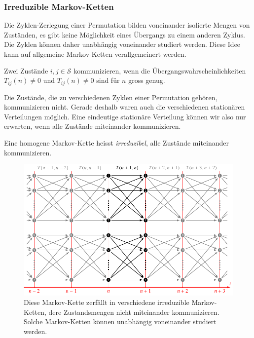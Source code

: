 \subsubsection{Irreduzible Markov-Ketten}
Die Zyklen-Zerlegung einer Permutation bilden voneinander isolierte
Mengen von Zuständen, es gibt keine Möglichkeit eines Übergangs zu
einem anderen Zyklus.
Die Zyklen können daher unabhängig voneinander studiert werden.
Diese Idee kann auf allgemeine Markov-Ketten verallgemeinert werden.

\begin{definition}
Zwei Zustände $i,j\in\mathcal{S}$ kommunizieren, wenn die
Übergangswahrscheinlichkeiten $T_{ij}(n) \ne 0$ und $T_{ij}(n)\ne 0$ sind
für $n$ gross genug.
\end{definition}

Die Zustände, die zu verschiedenen Zyklen einer Permutation gehören,
kommunizieren nicht.
Gerade deshalb waren auch die verschiedenen stationären Verteilungen
möglich.
Eine eindeutige stationäre Verteilung können wir also nur erwarten,
wenn alle Zustände miteinander kommunizieren.

\begin{definition}
Eine homogene Markov-Kette heisst {\em irreduzibel}, alle Zustände miteinander
kommunizieren.
\end{definition}

\begin{figure}
\centering
\includegraphics{chapters/80-wahrscheinlichkeit/images/markov2.pdf}
\caption{Diese Markov-Kette zerfällt in verschiedene irreduzible
Markov-Ketten, dere Zustandsmengen nicht miteinander kommunizieren.
Solche Markov-Ketten können unabhängig voneinander studiert werden.
\label{buch:wahrscheinlichkeit:fig:markovzerfall}}
\end{figure}

